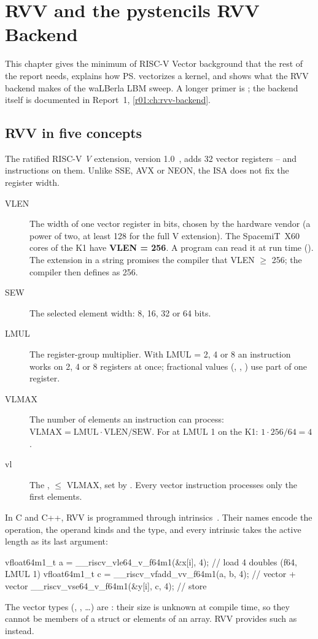 \chapter{RVV and the pystencils RVV Backend}\label{r02:ch:rvv-primer}

This chapter gives the minimum of RISC-V Vector background that the rest of the report
needs, explains how \ps{} vectorizes a kernel, and shows what the RVV backend makes of
the waLBerla LBM sweep. A longer primer is ; the
backend itself is documented in Report~1, \cref{r01:ch:rvv-backend}.

\section{RVV in five concepts}\label{r02:sec:rvv-concepts}

The ratified RISC-V \emph{V} extension, version 1.0~\cite{rvv-spec}, adds 32 vector
registers -- and instructions on them. Unlike SSE, AVX or NEON, the
ISA does not fix the register width.
\begin{description}
  \item[VLEN] The width of one vector register in bits, chosen by the hardware vendor
    (a power of two, at least 128 for the full V extension). The SpacemiT~X60 cores
    of the K1 have \textbf{VLEN = 256}. A program can read it at run time
    (). The extension  in a  string promises
    the compiler that VLEN $\geq$ 256; the compiler then defines
     as 256.
  \item[SEW] The selected element width: 8, 16, 32 or 64 bits.
  \item[LMUL] The register-group multiplier. With LMUL = 2, 4 or 8 an instruction works
    on 2, 4 or 8 registers at once; fractional values (, ,
    ) use part of one register.
  \item[VLMAX] The number of elements an instruction can process:
    $\text{VLMAX} = \text{LMUL}\cdot\text{VLEN}/\text{SEW}$. For  at LMUL 1
    on the K1: $1\cdot256/64 = 4$.
  \item[vl] The , $\leq$ VLMAX, set by . Every
    vector instruction processes only the first  elements.
\end{description}
In C and C++, RVV is programmed through intrinsics~\cite{rvv-intrinsics}. Their names
encode the operation, the operand kinds and the type, and every intrinsic takes the
active length as its last argument:
\begin{ccode}
vfloat64m1_t a = __riscv_vle64_v_f64m1(&x[i], 4);      // load 4 doubles (f64, LMUL 1)
vfloat64m1_t c = __riscv_vfadd_vv_f64m1(a, b, 4);      // vector + vector
__riscv_vse64_v_f64m1(&y[i], c, 4);                    // store
\end{ccode}
The vector types (, , \dots) are :
their size is unknown at compile time, so they cannot be members of a struct or
elements of an array. RVV provides  such as 
instead.

